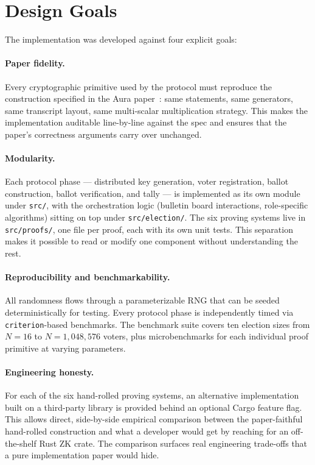 \documentclass[12pt,a4paper,oneside]{report}
\begin{document}
\section{Design Goals}
\label{sec:impl-goals}

The implementation was developed against four explicit goals:

\paragraph{Paper fidelity.}
Every cryptographic primitive used by the protocol must reproduce the 
construction specified in the Aura paper~\cite{aura2022}: same statements, 
same generators, same transcript layout, same multi-scalar multiplication 
strategy. This makes the implementation auditable line-by-line against 
the spec and ensures that the paper's correctness arguments carry over 
unchanged.

\paragraph{Modularity.}
Each protocol phase --- distributed key generation, voter registration, 
ballot construction, ballot verification, and tally --- is implemented as 
its own module under \texttt{src/}, with the orchestration logic 
(bulletin board interactions, role-specific algorithms) sitting on top 
under \texttt{src/election/}. The six proving systems live in 
\texttt{src/proofs/}, one file per proof, each with its own unit tests. 
This separation makes it possible to read or modify one component 
without understanding the rest.

\paragraph{Reproducibility and benchmarkability.}
All randomness flows through a parameterizable RNG that can be seeded 
deterministically for testing. Every protocol phase is independently 
timed via \texttt{criterion}-based benchmarks. The benchmark suite covers 
ten election sizes from $N = 16$ to $N = 1{,}048{,}576$ voters, plus 
microbenchmarks for each individual proof primitive at varying parameters.

\paragraph{Engineering honesty.}
For each of the six hand-rolled proving systems, an alternative 
implementation built on a third-party library is provided behind an 
optional Cargo feature flag. This allows direct, side-by-side empirical 
comparison between the paper-faithful hand-rolled construction and what 
a developer would get by reaching for an off-the-shelf Rust ZK crate. 
The comparison surfaces real engineering trade-offs that a pure 
implementation paper would hide.
\end{document}
